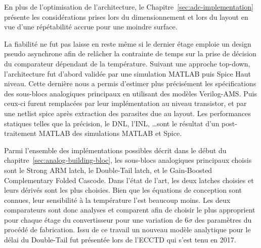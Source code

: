 \begin{mdframed}[linecolor=Prune,linewidth=1]
En plus de l'optimisation de l'architecture, le Chapitre~\ref{sec:adc-implementation} présente les considérations prises lors du dimensionnement et lors du layout en vue d'une répétabilité accrue pour une moindre surface.

La fiabilité ne fut pas laisse en reste même si le dernier étage emploie un design pseudo asynchrone afin de relâcher la contrainte de temps sur la prise de décision du comparateur dépendant de la température. Suivant une approche top-down, l'architecture fut d'abord validée par une simulation MATLAB puis Spice Haut niveau. Cette dernière nous a permis d'estimer plus précisément les spécifications des sous-blocs analogiques principaux en utilisant des modèles Verilog-AMS\@. Puis ceux-ci furent remplacées par leur implémentation au niveau transistor, et par une netlist spice après extraction des parasites due au layout. Les performances statiques telles que la précision, le DNL, l'INL, \ldots sont le résultat d'un post-traitement MATLAB des simulations MATLAB et Spice.

Parmi l'ensemble des implémentations possibles décrit dans le début du chapitre~\ref{sec:analog-building-bloc}, les sous-blocs analogiques principaux choisis sont le Strong ARM latch, le Double-Tail latch, et le Gain-Boosted Complementary Folded Cascode. Dans l'état de l'art, les deux latches choisies et leurs dérivés sont les plus choisies. Bien que les équations de conception sont connues, leur sensibilité à la température l'est beaucoup moins. Les deux comparateurs sont donc analyses et comparent afin de choisir le plus approprient pour chaque étage du convertisseur pour une variation de 6$\sigma$ des paramètres du procédé de fabrication. Issu de ce travail un nouveau modèle analytique pour le délai du Double-Tail fut présentée lors de l'ECCTD qui s'est tenu en 2017.


\end{mdframed}
